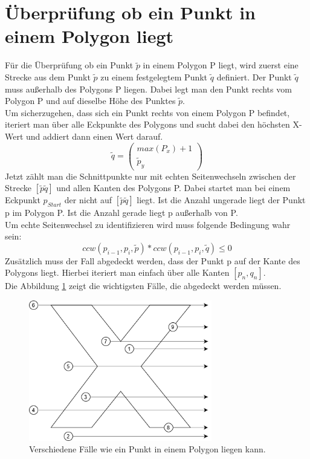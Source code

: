 \documentclass[conference]{IEEEtran}
\begin{document}
	\section{Überprüfung ob ein Punkt in einem Polygon liegt}
	Für die Überprüfung ob ein Punkt $\tilde{p}$ in einem Polygon P liegt, wird zuerst eine Strecke aus dem Punkt $\tilde{p}$ zu einem festgelegtem Punkt $\tilde{q}$ definiert. Der Punkt $\tilde{q}$ muss außerhalb des Polygons P liegen. Dabei legt man den Punkt rechts vom Polygon P und auf dieselbe Höhe des Punktes $\tilde{p}$.\\
	Um sicherzugehen, dass sich ein Punkt rechts von einem Polygon P befindet, iteriert man über alle Eckpunkte des Polygons und sucht dabei den höchsten X-Wert und addiert dann einen Wert darauf.\\
	\[ \tilde{q} = \left(\begin{array}{c}max(P_x)+1\\\tilde{p}_y\end{array}\right) \]
	Jetzt zählt man die Schnittpunkte nur mit echten Seitenwechseln zwischen der Strecke $[\tilde{p}\tilde{q}]$ und allen Kanten des Polygons P. Dabei startet man bei einem Eckpunkt $p_{Start}$ der nicht auf $[\tilde{p}\tilde{q}]$ liegt. Ist die Anzahl ungerade liegt der Punkt p im Polygon P. Ist die Anzahl gerade liegt p außerhalb von P.\\
	Um echte Seitenwechsel zu identifizieren wird muss folgende Bedingung wahr sein:
	\[ ccw(p_{i-1} , p_i, \tilde{p}) * ccw(p_{i-1} , p_i, \tilde{q}) \leq 0 \]
	Zusätzlich muss der Fall abgedeckt werden, dass der Punkt p auf der Kante des Polygons liegt. Hierbei iteriert man einfach über alle Kanten $[p_n,q_n]$.\\
	Die Abbildung \ref{PointInPoly} zeigt die wichtigsten Fälle, die abgedeckt werden müssen.
	\begin{figure}[h]
		\begin{center}
			\includegraphics[width=8cm]{PointInPolygon.png}
			\caption{Verschiedene Fälle wie ein Punkt in einem Polygon liegen kann.}
			\label{PointInPoly}
		\end{center}
	\end{figure}\\
\end{document}
